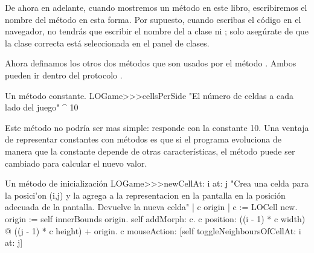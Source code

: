 \documentclass[a4paper,10pt,twoside]{book}
\begin{document}
{%
De ahora en adelante, cuando mostremos un m\'etodo en este libro, escribiremos el nombre del m\'etodo en esta forma. Por supuesto, cuando escribas el c\'odigo en el navegador, no tendr\'as que escribir el nombre del a clase ni \ct{>>>}; solo aseg\'urate de que la clase correcta est\'a seleccionada en el panel de clases. 


Ahora definamos los otros dos m\'etodos que son usados por el m\'etodo . Ambos pueden ir dentro del protocolo .

\begin{method}[sbegamecellsperside]{Un m\'etodo constante.}
LOGame>>>cellsPerSide
   "El n\'umero de celdas a cada lado del juego"
   ^ 10
\end{method}

Este m\'etodo no podr\'ia ser mas simple: responde con la constante 10. Una ventaja de representar constantes con m\'etodos es que si el programa evoluciona de manera que la constante depende de otras caracter\'isticas, el m\'etodo puede ser cambiado para calcular el nuevo valor. 

\begin{method}[newCellAt:at:]{Un m\'etodo de inicializaci\'on}
LOGame>>>newCellAt: i at: j
   "Crea una celda para la posici'on (i,j) y la agrega a la representacion
   en la pantalla en la posici\'on adecuada de la pantalla. Devuelve la nueva celda"
   | c origin |
   c := LOCell new.
   origin := self innerBounds origin.
   self addMorph: c.
   c position: ((i - 1) * c width) @ ((j - 1) * c height) + origin.
   c mouseAction: [self toggleNeighboursOfCellAt: i at: j]
\end{method}

}
\end{document}
